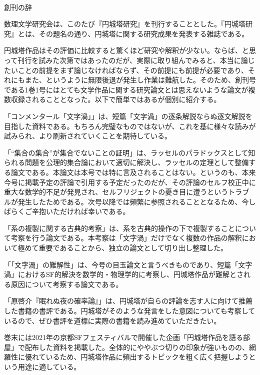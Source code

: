 \documentclass[10pt, a5paper, twoside]{jsarticle}
\theoremstyle{definition}
\begin{document}
	{\Large 　} %

	\begin{center}

		\Large{創刊の辞}

	\end{center}

	数理文学研究会は、このたび『円城塔研究』を刊行することとした。『円城塔研究』とは、その題名の通り、円城塔に関する研究成果を発表する雑誌である。

	円城塔作品はその評価に比較すると驚くほど研究や解釈が少ない。ならば、と思って刊行を試みた次第ではあったのだが、実際に取り組んでみると、本当に論じたいことの前提をまず論じなければならず、その前提にも前提が必要であり、それにもまた、というように無限後退が発生し作業は難航した。そのため、創刊号である1巻1号にはとても文学作品に関する研究論文とは思えないような論文が複数収録されることとなった。以下で簡単ではあるが個別に紹介する。

	「コンメンタール「文字渦」」は、短篇「文字渦」の逐条解説ならぬ逐文解説を目指した資料である。もちろん完璧なものではないが、これを基に様々な読みが試みられ、より刷新されていくことを期待している。

	「“集合の集合”が集合でないことの証明」は、ラッセルのパラドックスとして知られる問題を公理的集合論において適切に解決し、ラッセルの定理として整備する論文である。本論文は本号では特に言及されることはない。というのも、本来今号に掲載予定の評論で引用する予定だったのだが、その評論のセルフ校正中に重大な数学的不足が発見され、セルフリジェクトの憂き目に遭うというトラブルが発生したためである。次号以降では頻繁に参照されることとなるため、今しばらくご辛抱いただければ幸いである。

	「系の複製に関する古典的考察」は、系を古典的操作の下で複製することについて考察を行う論文である。本考察は「文字渦」だけでなく複数の作品の解釈において極めて重要であることから、独立の論文として切り出し整理した。

	「「文字渦」の難解性」は、今号の目玉論文と言うべきものであり、短篇「文字渦」におけるSF的解決を数学的・物理学的に考察し、円城塔作品が難解とされる原因について考察する論文である。

	「原啓介『眠れぬ夜の確率論』」は、円城塔が自らの評論を志す人に向けて推薦した書籍の書評である。円城塔がそのような発言をした意図についても考察しているので、ぜひ書評を道標に実際の書籍を読み進めていただきたい。

	巻末には2021年の京都SFフェスティバルで開催した企画「円城塔作品を語る部屋」で配布した資料を掲載した。全体的にややぶつ切りの印象が強いものの、網羅性に優れているため、円城塔作品に頻出するトピックを粗く広く把握しようという用途に適している。
\end{document}
